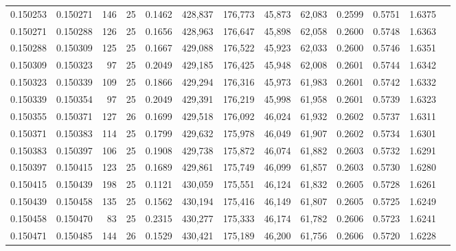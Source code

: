 \begin{tabular}{rrrrrrrrrrrrr}
0.150253 & 0.150271 &   146 &  25 &                                     0.1462 & 428,837 & 176,773 &  45,873 &  62,083 & 0.2599 & 0.5751 & 1.6375 \\
0.150271 & 0.150288 &   126 &  25 &                                     0.1656 & 428,963 & 176,647 &  45,898 &  62,058 & 0.2600 & 0.5748 & 1.6363 \\
0.150288 & 0.150309 &   125 &  25 &                                     0.1667 & 429,088 & 176,522 &  45,923 &  62,033 & 0.2600 & 0.5746 & 1.6351 \\
0.150309 & 0.150323 &    97 &  25 &                                     0.2049 & 429,185 & 176,425 &  45,948 &  62,008 & 0.2601 & 0.5744 & 1.6342 \\
0.150323 & 0.150339 &   109 &  25 &                                     0.1866 & 429,294 & 176,316 &  45,973 &  61,983 & 0.2601 & 0.5742 & 1.6332 \\
0.150339 & 0.150354 &    97 &  25 &                                     0.2049 & 429,391 & 176,219 &  45,998 &  61,958 & 0.2601 & 0.5739 & 1.6323 \\
0.150355 & 0.150371 &   127 &  26 &                                     0.1699 & 429,518 & 176,092 &  46,024 &  61,932 & 0.2602 & 0.5737 & 1.6311 \\
0.150371 & 0.150383 &   114 &  25 &                                     0.1799 & 429,632 & 175,978 &  46,049 &  61,907 & 0.2602 & 0.5734 & 1.6301 \\
0.150383 & 0.150397 &   106 &  25 &                                     0.1908 & 429,738 & 175,872 &  46,074 &  61,882 & 0.2603 & 0.5732 & 1.6291 \\
0.150397 & 0.150415 &   123 &  25 &                                     0.1689 & 429,861 & 175,749 &  46,099 &  61,857 & 0.2603 & 0.5730 & 1.6280 \\
0.150415 & 0.150439 &   198 &  25 &                                     0.1121 & 430,059 & 175,551 &  46,124 &  61,832 & 0.2605 & 0.5728 & 1.6261 \\
0.150439 & 0.150458 &   135 &  25 &                                     0.1562 & 430,194 & 175,416 &  46,149 &  61,807 & 0.2605 & 0.5725 & 1.6249 \\
0.150458 & 0.150470 &    83 &  25 &                                     0.2315 & 430,277 & 175,333 &  46,174 &  61,782 & 0.2606 & 0.5723 & 1.6241 \\
0.150471 & 0.150485 &   144 &  26 &                                     0.1529 & 430,421 & 175,189 &  46,200 &  61,756 & 0.2606 & 0.5720 & 1.6228 \\

\end{tabular}
